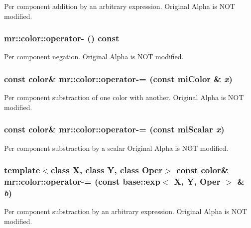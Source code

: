 Per component addition by an arbitrary expression. Original Alpha is NOT modified. 
\subsubsection{ mr::color::operator- () const\hspace{0.3cm}{\tt  [inline]}}\label{structmr_1_1color_z14_0}


Per component negation. Original Alpha is NOT modified. 

\subsubsection{\setlength{\rightskip}{0pt plus 5cm}const {\bf color}\& mr::color::operator-= (const mi\-Color \& {\em x})\hspace{0.3cm}{\tt  [inline]}}\label{structmr_1_1color_z14_6}


Per component substraction of one color with another. Original Alpha is NOT modified. 
\subsubsection{\setlength{\rightskip}{0pt plus 5cm}const {\bf color}\& mr::color::operator-= (const mi\-Scalar {\em x})\hspace{0.3cm}{\tt  [inline]}}\label{structmr_1_1color_z14_5}


Per component substraction by a scalar Original Alpha is NOT modified. 
\subsubsection{\setlength{\rightskip}{0pt plus 5cm}template$<$class X, class Y, class Oper$>$ const {\bf color}\& mr::color::operator-= (const {\bf base::exp}$<$ X, Y, Oper $>$ \& {\em b})\hspace{0.3cm}{\tt  [inline]}}\label{structmr_1_1color_z14_4}


Per component substraction by an arbitrary expression. Original Alpha is NOT modified. 
